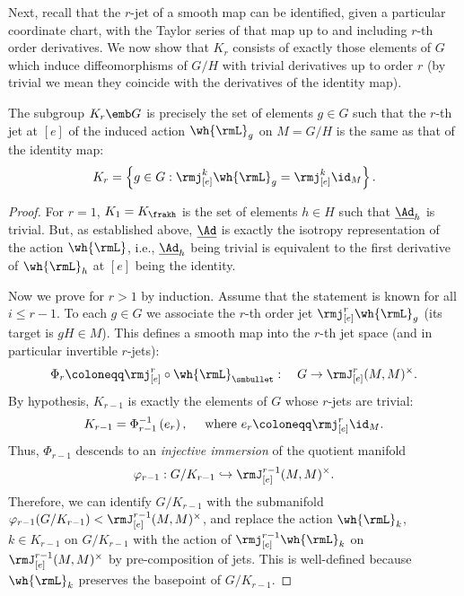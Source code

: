 Next, recall that the $r$-jet of a smooth map can be identified, given a particular coordinate chart, with the Taylor series of that map up to and including $r$-th order derivatives. We now show that $K_r$ consists of exactly those elements of $G$ which induce diffeomorphisms of $G\slash H$ with trivial derivatives up to order $r$ (by trivial we mean they coincide with the derivatives of the identity map).

\begin{lem}
    The subgroup $K_r\emb G$ is precisely the set of elements $g\in G$
    such that the $r$-th jet at $[e]$ of the induced action $\wh{\rmL}_g$ on $M=G\slash H$ is the same as that of the identity map:
    \[K_r=\left\{g\in G: \rmj^k_{[e]}\wh{\rmL}_g=\rmj^k_{[e]}\id_{M}\right\}.\]
\end{lem}
\begin{proof}
    For $r=1$, $K_1=K_{\frakh}$ is the set of elements $h\in H$ such that $\underline{\Ad}_h$ is trivial. But, as established above, $\underline{\Ad}$ is exactly the isotropy representation of the action $\wh{\rmL}$, i.e., $\underline{\Ad}_h$ being trivial is equivalent to the first derivative of $\wh{\rmL}_h$ at $[e]$ being the identity.

    Now we prove for $r>1$ by induction. Assume that the statement is known for all $i\leq r-1$. To each $g\in G$ we associate the $r$-th order jet $\rmj^r_{[e]}\wh{\rmL}_g$ (its target is $gH\in M$). This defines a smooth map into the $r$-th jet space (and in particular invertible $r$-jets):
    \[\Phi_r\coloneqq \rmj_{[e]}^r\circ \wh{\rmL}_{\smbullet}:\quad  G\to \rmJ^r_{[e]}(M,M)^\times.\]
    By hypothesis, $K_{r-1}$ is exactly the elements of $G$ whose $r$-jets are trivial:
    \[K_{r-1}=\Phi_{r-1}^{-1}\left(e_r\right), \quad \text{ where }e_r\coloneqq \rmj^r_{[e]}\id_M.\]
    Thus, $\Phi_{r-1}$ descends to an \emph{injective immersion} of the quotient manifold
    \[\varphi_{r-1}:G\slash K_{r-1}\hookrightarrow \rmJ^{r-1}_{[e]}(M,M)^\times.\]
    Therefore, we can identify $G\slash K_{r-1}$ with the submanifold $\varphi_{r-1}(G\slash K_{r-1})< \rmJ^{r-1}_{[e]}(M,M)^\times$, and replace the action $\wh{\rmL}_k$, $k\in K_{r-1}$ on $G\slash K_{r-1}$ with the action of $\rmj^{r-1}_{[e]}\wh{\rmL}_k$ on $\rmJ^{r-1}_{[e]}(M,M)^\times$ by pre-composition of jets. This is well-defined because $\wh{\rmL}_k$ preserves the basepoint of $G\slash K_{r-1}$.
    

\end{proof}
